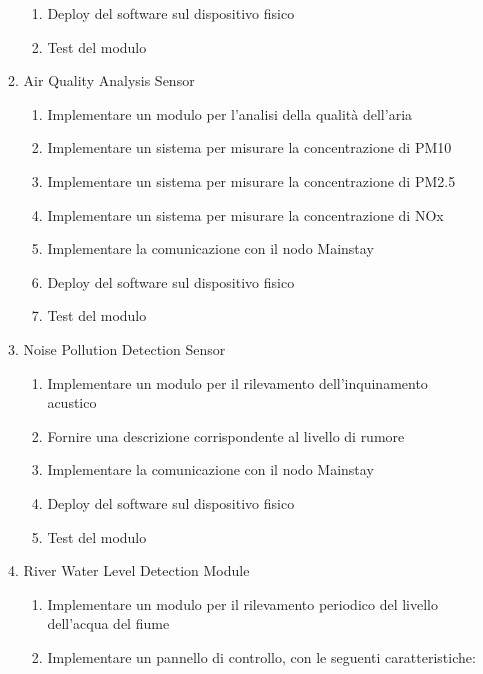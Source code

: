 \begin{enumerate}
\begin{enumerate}
\begin{enumerate}
                        \item Deploy del software sul dispositivo fisico
                        \item Test del modulo
                    \end{enumerate}
              \item Air Quality Analysis Sensor
                    \begin{enumerate}
                        \item Implementare un modulo per l'analisi della qualità dell'aria
                        \item Implementare un sistema per misurare la concentrazione di PM10
                        \item Implementare un sistema per misurare la concentrazione di PM2.5
                        \item Implementare un sistema per misurare la concentrazione di NOx
                        \item Implementare la comunicazione con il nodo Mainstay
                        \item Deploy del software sul dispositivo fisico
                        \item Test del modulo
                    \end{enumerate}
              \item Noise Pollution Detection Sensor
                    \begin{enumerate}
                        \item Implementare un modulo per il rilevamento dell'inquinamento acustico
                        \item Fornire una descrizione corrispondente al livello di rumore
                        \item Implementare la comunicazione con il nodo Mainstay
                        \item Deploy del software sul dispositivo fisico
                        \item Test del modulo
                    \end{enumerate}
              \item River Water Level Detection Module
                    \begin{enumerate}
                        \item Implementare un modulo per il rilevamento periodico del livello dell'acqua del fiume
                        \item Implementare un pannello di controllo, con le seguenti caratteristiche:

\end{enumerate}
\end{enumerate}
\end{enumerate}
